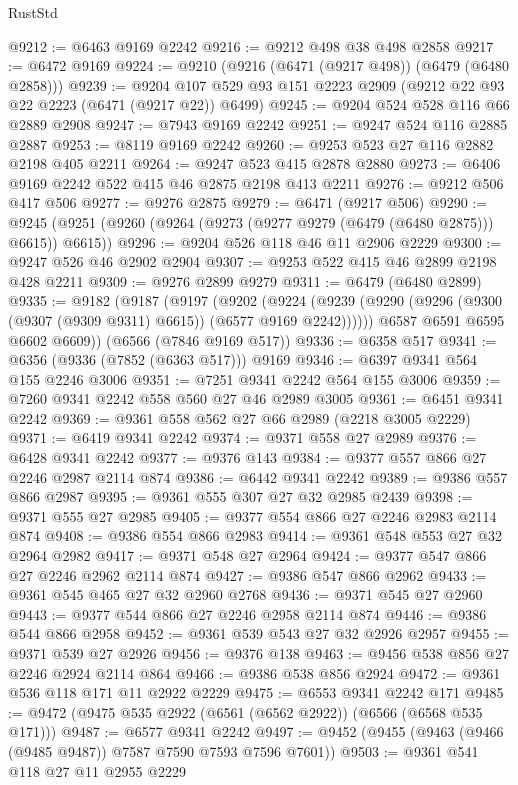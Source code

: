 \begin{lexlean}{RustStd}
\begin{coremodule}
{\begin{coremodule}
{{{{{{{{{{{{{{{{{{{{{{{{{{@9212 := @6463 @9169 @2242
@9216 := @9212 @498 @38 @498 @2858
@9217 := @6472 @9169
@9224 := @9210 (@9216 (@6471 (@9217 @498)) (@6479 (@6480 @2858)))
@9239 := @9204 @107 @529 @93 @151 @2223 @2909 (@9212 @22 @93 @22 @2223 (@6471 (@9217 @22)) @6499)
@9245 := @9204 @524 @528 @116 @66 @2889 @2908
@9247 := @7943 @9169 @2242
@9251 := @9247 @524 @116 @2885 @2887
@9253 := @8119 @9169 @2242
@9260 := @9253 @523 @27 @116 @2882 @2198 @405 @2211
@9264 := @9247 @523 @415 @2878 @2880
@9273 := @6406 @9169 @2242 @522 @415 @46 @2875 @2198 @413 @2211
@9276 := @9212 @506 @417 @506
@9277 := @9276 @2875
@9279 := @6471 (@9217 @506)
@9290 := @9245 (@9251 (@9260 (@9264 (@9273 (@9277 @9279 (@6479 (@6480 @2875))) @6615)) @6615))
@9296 := @9204 @526 @118 @46 @11 @2906 @2229
@9300 := @9247 @526 @46 @2902 @2904
@9307 := @9253 @522 @415 @46 @2899 @2198 @428 @2211
@9309 := @9276 @2899 @9279
@9311 := @6479 (@6480 @2899)
@9335 := @9182
    (@9187
      (@9197
        (@9202
          (@9224 (@9239 (@9290 (@9296 (@9300 (@9307 (@9309 @9311) @6615)) (@6577 @9169 @2242))))))
        @6587
        @6591
        @6595
        @6602
        @6609))
    (@6566 (@7846 @9169 @517))
@9336 := @6358 @517
@9341 := @6356 (@9336 (@7852 (@6363 @517))) @9169
@9346 := @6397 @9341 @564 @155 @2246 @3006
@9351 := @7251 @9341 @2242 @564 @155 @3006
@9359 := @7260 @9341 @2242 @558 @560 @27 @46 @2989 @3005
@9361 := @6451 @9341 @2242
@9369 := @9361 @558 @562 @27 @66 @2989 (@2218 @3005 @2229)
@9371 := @6419 @9341 @2242
@9374 := @9371 @558 @27 @2989
@9376 := @6428 @9341 @2242
@9377 := @9376 @143
@9384 := @9377 @557 @866 @27 @2246 @2987 @2114 @874
@9386 := @6442 @9341 @2242
@9389 := @9386 @557 @866 @2987
@9395 := @9361 @555 @307 @27 @32 @2985 @2439
@9398 := @9371 @555 @27 @2985
@9405 := @9377 @554 @866 @27 @2246 @2983 @2114 @874
@9408 := @9386 @554 @866 @2983
@9414 := @9361 @548 @553 @27 @32 @2964 @2982
@9417 := @9371 @548 @27 @2964
@9424 := @9377 @547 @866 @27 @2246 @2962 @2114 @874
@9427 := @9386 @547 @866 @2962
@9433 := @9361 @545 @465 @27 @32 @2960 @2768
@9436 := @9371 @545 @27 @2960
@9443 := @9377 @544 @866 @27 @2246 @2958 @2114 @874
@9446 := @9386 @544 @866 @2958
@9452 := @9361 @539 @543 @27 @32 @2926 @2957
@9455 := @9371 @539 @27 @2926
@9456 := @9376 @138
@9463 := @9456 @538 @856 @27 @2246 @2924 @2114 @864
@9466 := @9386 @538 @856 @2924
@9472 := @9361 @536 @118 @171 @11 @2922 @2229
@9475 := @6553 @9341 @2242 @171
@9485 := @9472 (@9475 @535 @2922 (@6561 (@6562 @2922)) (@6566 (@6568 @535 @171)))
@9487 := @6577 @9341 @2242
@9497 := @9452 (@9455 (@9463 (@9466 (@9485 @9487)) @7587 @7590 @7593 @7596 @7601))
@9503 := @9361 @541 @118 @27 @11 @2955 @2229
}}}}}}}}}}}}}}}}}}}}}}}}}}
\end{coremodule}}
\end{coremodule}
\end{lexlean}
